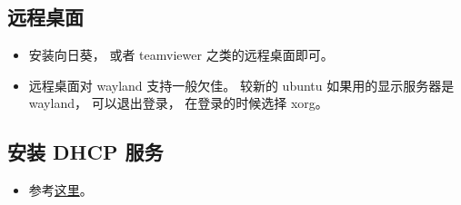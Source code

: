 \subsection{远程桌面}
\begin{itemize}
\item 安装向日葵， 或者 teamviewer 之类的远程桌面即可。
\item 远程桌面对 wayland 支持一般欠佳。 较新的 ubuntu 如果用的显示服务器是 wayland， 可以退出登录， 在登录的时候选择 xorg。
\end{itemize}

\subsection{安装 DHCP 服务}
\begin{itemize}
\item 参考\href{https://www.linuxtechi.com/how-to-configure-dhcp-server-on-ubuntu/}{这里}。
\end{itemize}
